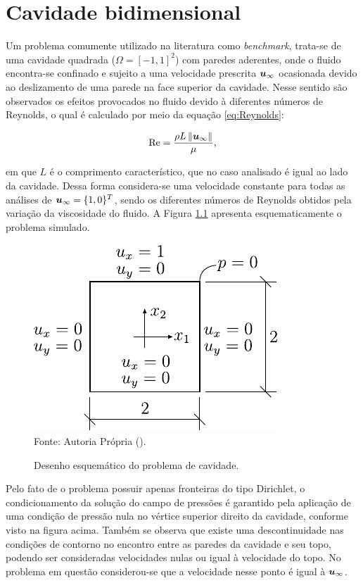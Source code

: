 \chapter[APÊNDICE \ref{Ap:Cavity}]{Cavidade bidimensional}
\label{Ap:Cavity}

Um problema comumente utilizado na literatura como \textit{benchmark}, trata-se de uma cavidade quadrada ($\Omega=[-1,1]^2$) com paredes aderentes, onde o fluido encontra-se confinado e sujeito a uma velocidade prescrita $\boldsymbol{u}_\infty$ ocasionada devido ao deslizamento de uma parede na face superior da cavidade. Nesse sentido são observados os efeitos provocados no fluido devido à diferentes números de Reynolds, o qual é calculado por meio da equação \eqref{eq:Reynolds}:

\begin{equation}
    \mathrm{Re}=\frac{\rho L\left\lVert{\boldsymbol{u}_\infty}\right\lVert}{\mu}\text{,}
    \label{eq:Reynolds}
\end{equation}

\noindent em que $L$ é o comprimento característico, que no caso analisado é igual ao lado da cavidade. Dessa forma considera-se uma velocidade constante para todas as análises de $\boldsymbol{u}_\infty=\{1,0\}^T$, sendo os diferentes números de Reynolds obtidos pela variação da viscosidade do fluido. A Figura \ref{fig:cavity} apresenta esquematicamente o problema simulado.

\begin{figure}[h!]
    \centering
    \caption{Desenho esquemático do problema de cavidade.}
    \includegraphics[width=.35\linewidth]{Figuras/Cavity/cavidade.pdf}
    \\Fonte: Autoria Própria (\the\year).
    \label{fig:cavity}
\end{figure}

Pelo fato de o problema possuir apenas fronteiras do tipo Dirichlet, o condicionamento da solução do campo de pressões é garantido pela aplicação de uma condição de pressão nula no vértice superior direito da cavidade, conforme visto na figura acima.  Também se observa que existe uma descontinuidade nas condições de contorno no encontro entre as paredes da cavidade e seu topo, podendo ser consideradas velocidades nulas ou igual à velocidade do topo. No problema em questão considerou-se que a velocidade nesse ponto é igual à $\boldsymbol{u}_\infty$.

